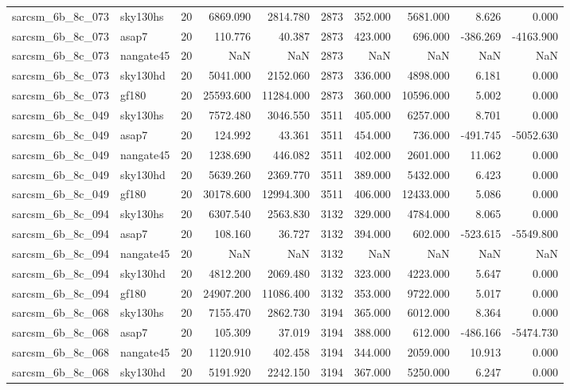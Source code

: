 \begin{tabular}{llrrrrrrrr}
sarcsm\_6b\_8c\_073 & sky130hs & 20 & 6869.090 & 2814.780 & 2873 & 352.000 & 5681.000 & 8.626 & 0.000 \\
sarcsm\_6b\_8c\_073 & asap7 & 20 & 110.776 & 40.387 & 2873 & 423.000 & 696.000 & -386.269 & -4163.900 \\
sarcsm\_6b\_8c\_073 & nangate45 & 20 & NaN & NaN & 2873 & NaN & NaN & NaN & NaN \\
sarcsm\_6b\_8c\_073 & sky130hd & 20 & 5041.000 & 2152.060 & 2873 & 336.000 & 4898.000 & 6.181 & 0.000 \\
sarcsm\_6b\_8c\_073 & gf180 & 20 & 25593.600 & 11284.000 & 2873 & 360.000 & 10596.000 & 5.002 & 0.000 \\
sarcsm\_6b\_8c\_049 & sky130hs & 20 & 7572.480 & 3046.550 & 3511 & 405.000 & 6257.000 & 8.701 & 0.000 \\
sarcsm\_6b\_8c\_049 & asap7 & 20 & 124.992 & 43.361 & 3511 & 454.000 & 736.000 & -491.745 & -5052.630 \\
sarcsm\_6b\_8c\_049 & nangate45 & 20 & 1238.690 & 446.082 & 3511 & 402.000 & 2601.000 & 11.062 & 0.000 \\
sarcsm\_6b\_8c\_049 & sky130hd & 20 & 5639.260 & 2369.770 & 3511 & 389.000 & 5432.000 & 6.423 & 0.000 \\
sarcsm\_6b\_8c\_049 & gf180 & 20 & 30178.600 & 12994.300 & 3511 & 406.000 & 12433.000 & 5.086 & 0.000 \\
sarcsm\_6b\_8c\_094 & sky130hs & 20 & 6307.540 & 2563.830 & 3132 & 329.000 & 4784.000 & 8.065 & 0.000 \\
sarcsm\_6b\_8c\_094 & asap7 & 20 & 108.160 & 36.727 & 3132 & 394.000 & 602.000 & -523.615 & -5549.800 \\
sarcsm\_6b\_8c\_094 & nangate45 & 20 & NaN & NaN & 3132 & NaN & NaN & NaN & NaN \\
sarcsm\_6b\_8c\_094 & sky130hd & 20 & 4812.200 & 2069.480 & 3132 & 323.000 & 4223.000 & 5.647 & 0.000 \\
sarcsm\_6b\_8c\_094 & gf180 & 20 & 24907.200 & 11086.400 & 3132 & 353.000 & 9722.000 & 5.017 & 0.000 \\
sarcsm\_6b\_8c\_068 & sky130hs & 20 & 7155.470 & 2862.730 & 3194 & 365.000 & 6012.000 & 8.364 & 0.000 \\
sarcsm\_6b\_8c\_068 & asap7 & 20 & 105.309 & 37.019 & 3194 & 388.000 & 612.000 & -486.166 & -5474.730 \\
sarcsm\_6b\_8c\_068 & nangate45 & 20 & 1120.910 & 402.458 & 3194 & 344.000 & 2059.000 & 10.913 & 0.000 \\
sarcsm\_6b\_8c\_068 & sky130hd & 20 & 5191.920 & 2242.150 & 3194 & 367.000 & 5250.000 & 6.247 & 0.000 \\

\end{tabular}
